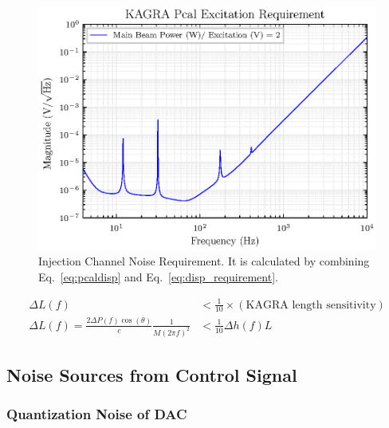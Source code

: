 \begin{figure}[hbt!]
\centering
\includegraphics[width=.9\textwidth]{figure/DAC_requirement.eps}
\caption[Injection Channel Noise Requirement]{Injection Channel Noise Requirement. It is calculated by combining Eq.~\ref{eq:pcaldisp} and Eq.~\ref{eq:disp_requirement}.
}

\label{fig:DAC_noise_requirement}
\end{figure}

\begin{align}
   \Delta L(f) &< \frac{1}{10} \times (\text{KAGRA length sensitivity})\\
   \Delta L(f) =\frac{2 \Delta P(f) \cos(\theta)}{c} \frac{1}{M(2 \pi f)^2} &< \frac{1}{10} \Delta h(f) L
   \label{eq:disp_requirement}
\end{align}




\subsection{Noise Sources from Control Signal}
\subsubsection{Quantization Noise of DAC}


